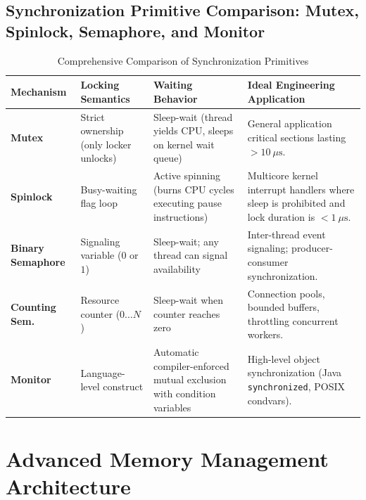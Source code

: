 \subsection{Synchronization Primitive Comparison: Mutex, Spinlock, Semaphore, and Monitor}
\begin{table}[htbp]
\centering
\small
\caption{Comprehensive Comparison of Synchronization Primitives}
\label{tab:sync_primitives_comparison}
\begin{tabularx}{\textwidth}{l p{2.8cm} p{3.2cm} X}
\toprule
\textbf{Mechanism} & \textbf{Locking Semantics} & \textbf{Waiting Behavior} & \textbf{Ideal Engineering Application} \\
\midrule
\textbf{Mutex} & Strict ownership (only locker unlocks) & Sleep-wait (thread yields CPU, sleeps on kernel wait queue) & General application critical sections lasting $> 10\ \mu\text{s}$. \\
\textbf{Spinlock} & Busy-waiting flag loop & Active spinning (burns CPU cycles executing pause instructions) & Multicore kernel interrupt handlers where sleep is prohibited and lock duration is $< 1\ \mu\text{s}$. \\
\textbf{Binary Semaphore} & Signaling variable ($0$ or $1$) & Sleep-wait; any thread can signal availability & Inter-thread event signaling; producer-consumer synchronization. \\
\textbf{Counting Sem.} & Resource counter ($0 \dots N$) & Sleep-wait when counter reaches zero & Connection pools, bounded buffers, throttling concurrent workers. \\
\textbf{Monitor} & Language-level construct & Automatic compiler-enforced mutual exclusion with condition variables & High-level object synchronization (Java \texttt{synchronized}, POSIX condvars). \\
\bottomrule
\end{tabularx}
\end{table}

\section{Advanced Memory Management Architecture}
\label{sec:os_adv_memory}

